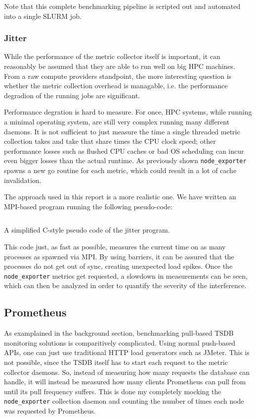 Note that this complete benchmarking pipeline is scripted out and automated into a single SLURM job.
\subsubsection{Jitter}
While the performance of the metric collector itself is important, it can reasonably be assumed that they are able to run well on big \ac{HPC} machines. From a raw compute providers standpoint, the more interesting question is whether the metric collection overhead is managable, i.e. the performance degradion of the running jobs are significant. 

Performance degration is hard to measure. For once, \ac{HPC} systems, while running a minimal operating system, are still very complex running many different daemons. It is not sufficient to just measure the time a single threaded metric collection takes and take that share times the CPU clock speed; other performance losses such as flushed CPU caches or bad OS scheduling can incur even bigger losses than the actual runtime. As previously shown \texttt{node\_exporter} spawns a new go routine for each metric, which could result in a lot of cache invalidation.

The approach used in this report is a more realistic one. We have written an MPI-based program running the following pseudo-code:
\begin{listing}[H]
  \inputminted{C}{./jitter.c}
  \caption{A simplified C-style pseudo code of the jitter program.}
\end{listing}
This code just, as fast as possible, measures the current time on as many processes as spawned via MPI. By using barriers, it can be assured that the processes do not get out of sync, creating unexpected load spikes. Once the \texttt{node\_exporter} metrics get requested, a slowdown in measurements can be seen, which can then be analyzed in order to quantify the severity of the interference.

\subsection{Prometheus}
As examplained in the background section, benchmarking pull-based \ac{TSDB} monitoring solutions is comparitively complicated. Using normal push-based APIs, one can just use traditional HTTP load generators such as JMeter. This is not possible, since the \ac{TSDB} itself has to start each request to the metric collector daemons. So, instead of measuring how many requests the database can handle, it will instead be measured how many clients Prometheus can pull from until its pull frequency suffers. This is done my completely mocking the \texttt{node\_exporter} collection daemon and counting the number of times each node was requested by Prometheus.

